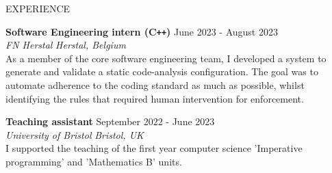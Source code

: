 \documentclass{resume} %
\begin{document}
\begin{rSection}{EXPERIENCE}

  \textbf{Software Engineering intern (C\texttt{++})} \hfill June 2023 - August 2023\\
\textit{FN Herstal} \hfill \textit{Herstal, Belgium} \\
As a member of the core software engineering team, I developed a system to generate and validate a static code-analysis configuration. The goal was to automate adherence to the coding standard as much as possible, whilst identifying the rules that required human intervention for enforcement.

\textbf{Teaching assistant} \hfill September 2022 - June 2023\\
\textit{University of Bristol} \hfill \textit{Bristol, UK} \\
I supported the teaching of the first year computer science 'Imperative programming' and 'Mathematics B' units.
 
\end{rSection} 

\end{document}
